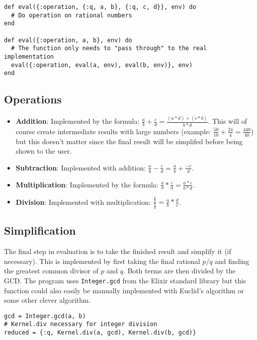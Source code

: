 \documentclass[a4paper,11pt]{article}
\begin{document}
\begin{verbatim}
def eval({:operation, {:q, a, b}, {:q, c, d}}, env) do
  # Do operation on rational numbers
end

def eval({:operation, a, b}, env) do
  # The function only needs to "pass through" to the real implementation
  eval({:operation, eval(a, env), eval(b, env)}, env)
end
\end{verbatim}

\subsection*{Operations}

\begin{itemize}
	\item \textbf{Addition}: Implemented by the formula: $\frac{a}{b} + \frac{c}{d} = \frac{(a*d)+(c*b)}{b*d}$.
  This will of course create intermediate results with large numbers (example:  $\frac{50}{10} + \frac{24}{4} = \frac{440}{40}$)
  but this doesn't matter since the final result will be simplifed before being shown to the user.
  \item \textbf{Subtraction}: Implemented with addition: $\frac{a}{b} - \frac{c}{d} = \frac{a}{b} + \frac{-c}{d}$.
  \item \textbf{Multiplication}: Implemented by the formula: $\frac{a}{b} * \frac{c}{d} = \frac{a*c}{b*d}$.
  \item \textbf{Division}: Implemented with multiplication: $\frac{\frac{a}{b}}{\frac{c}{d}} = \frac{a}{b} * \frac{d}{c}$.
\end{itemize}

\subsection*{Simplification}

The final step in evaluation is to take the finished result and simplify it (if necessary).
This is implemented by first taking the final rational $p/q$ and finding the greatest common divisor of $p$ and $q$.
Both terms are then divided by the GCD. The program uses \texttt{Integer.gcd} from the Elixir standard library but this function
could also easily be manually implemented with Euclid's algorithm or some other clever algorithm.

\begin{verbatim}
gcd = Integer.gcd(a, b)
# Kernel.div necessary for integer division
reduced = {:q, Kernel.div(a, gcd), Kernel.div(b, gcd)}
\end{verbatim}
\end{document}
